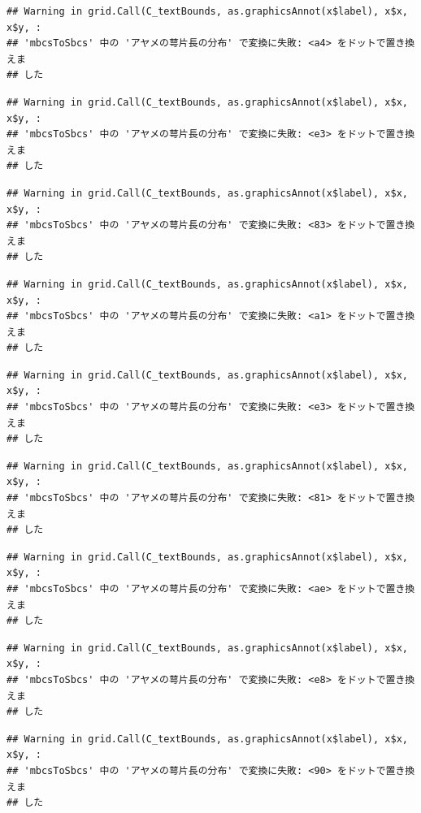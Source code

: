 \documentclass[
]{book}
\begin{document}
\begin{verbatim}
## Warning in grid.Call(C_textBounds, as.graphicsAnnot(x$label), x$x, x$y, :
## 'mbcsToSbcs' 中の 'アヤメの萼片長の分布' で変換に失敗: <a4> をドットで置き換えま
## した
\end{verbatim}

\begin{verbatim}
## Warning in grid.Call(C_textBounds, as.graphicsAnnot(x$label), x$x, x$y, :
## 'mbcsToSbcs' 中の 'アヤメの萼片長の分布' で変換に失敗: <e3> をドットで置き換えま
## した
\end{verbatim}

\begin{verbatim}
## Warning in grid.Call(C_textBounds, as.graphicsAnnot(x$label), x$x, x$y, :
## 'mbcsToSbcs' 中の 'アヤメの萼片長の分布' で変換に失敗: <83> をドットで置き換えま
## した
\end{verbatim}

\begin{verbatim}
## Warning in grid.Call(C_textBounds, as.graphicsAnnot(x$label), x$x, x$y, :
## 'mbcsToSbcs' 中の 'アヤメの萼片長の分布' で変換に失敗: <a1> をドットで置き換えま
## した
\end{verbatim}

\begin{verbatim}
## Warning in grid.Call(C_textBounds, as.graphicsAnnot(x$label), x$x, x$y, :
## 'mbcsToSbcs' 中の 'アヤメの萼片長の分布' で変換に失敗: <e3> をドットで置き換えま
## した
\end{verbatim}

\begin{verbatim}
## Warning in grid.Call(C_textBounds, as.graphicsAnnot(x$label), x$x, x$y, :
## 'mbcsToSbcs' 中の 'アヤメの萼片長の分布' で変換に失敗: <81> をドットで置き換えま
## した
\end{verbatim}

\begin{verbatim}
## Warning in grid.Call(C_textBounds, as.graphicsAnnot(x$label), x$x, x$y, :
## 'mbcsToSbcs' 中の 'アヤメの萼片長の分布' で変換に失敗: <ae> をドットで置き換えま
## した
\end{verbatim}

\begin{verbatim}
## Warning in grid.Call(C_textBounds, as.graphicsAnnot(x$label), x$x, x$y, :
## 'mbcsToSbcs' 中の 'アヤメの萼片長の分布' で変換に失敗: <e8> をドットで置き換えま
## した
\end{verbatim}

\begin{verbatim}
## Warning in grid.Call(C_textBounds, as.graphicsAnnot(x$label), x$x, x$y, :
## 'mbcsToSbcs' 中の 'アヤメの萼片長の分布' で変換に失敗: <90> をドットで置き換えま
## した
\end{verbatim}
\end{document}
